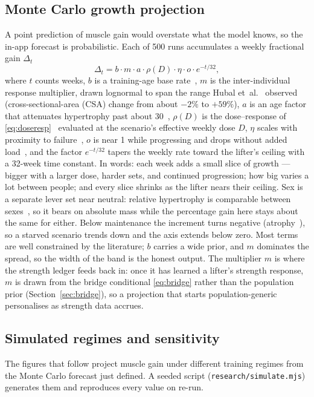 \documentclass[11pt,a4paper]{article}
\begin{document}
\subsection{Monte Carlo growth projection}\label{sec:mc}
A point prediction of muscle gain would overstate what the model knows, so the in-app forecast is probabilistic. Each of 500 runs accumulates a weekly fractional gain $\Delta_t$
\begin{equation}\label{eq:mcgain}
\Delta_t = b \cdot m \cdot a \cdot \rho(D) \cdot \eta \cdot o \cdot e^{-t/32},
\end{equation}
where $t$ counts weeks, $b$ is a training-age base rate~\cite{damas}, $m$ is the inter-individual response multiplier, drawn lognormal to span the range Hubal et~al.~\cite{hubal} observed (cross-sectional-area (CSA) change from about $-2\%$ to $+59\%$), $a$ is an age factor that attenuates hypertrophy past about 30~\cite{peterson}, $\rho(D)$ is the dose--response of \eqref{eq:doseresp}~\cite{sch17,drr} evaluated at the scenario's effective weekly dose $D$, $\eta$ scales with proximity to failure~\cite{failureprox}, $o$ is near 1 while progressing and drops without added load~\cite{plotkin}, and the factor $e^{-t/32}$ tapers the weekly rate toward the lifter's ceiling with a 32-week time constant. In words: each week adds a small slice of growth --- bigger with a larger dose, harder sets, and continued progression; how big varies a lot between people; and every slice shrinks as the lifter nears their ceiling. Sex is a separate lever set near neutral: relative hypertrophy is comparable between sexes~\cite{roberts}, so it bears on absolute mass while the percentage gain here stays about the same for either. Below maintenance the increment turns negative (atrophy~\cite{mujika}), so a starved scenario trends down and the axis extends below zero. Most terms are well constrained by the literature; $b$ carries a wide prior, and $m$ dominates the spread, so the width of the band is the honest output. The multiplier $m$ is where the strength ledger feeds back in: once it has learned a lifter's strength response, $m$ is drawn from the bridge conditional \eqref{eq:bridge} rather than the population prior (Section~\ref{sec:bridge}), so a projection that starts population-generic personalises as strength data accrues.

\subsection{Simulated regimes and sensitivity}\label{sec:sims}
The figures that follow project muscle gain under different training regimes from the Monte Carlo forecast just defined. A seeded script (\texttt{research/simulate.mjs}) generates them and reproduces every value on re-run.
\end{document}
